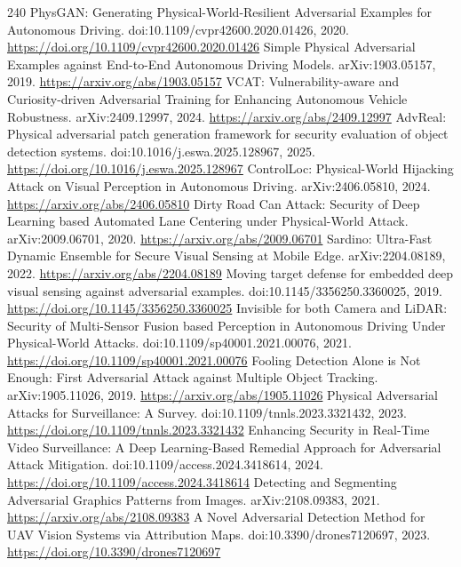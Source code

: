 \documentclass[11pt]{article}
\begin{document}
\begin{thebibliography}{240}
 PhysGAN: Generating Physical-World-Resilient Adversarial Examples for Autonomous Driving. doi:10.1109/cvpr42600.2020.01426, 2020. \url{https://doi.org/10.1109/cvpr42600.2020.01426}
 Simple Physical Adversarial Examples against End-to-End Autonomous Driving Models. arXiv:1903.05157, 2019. \url{https://arxiv.org/abs/1903.05157}
 VCAT: Vulnerability-aware and Curiosity-driven Adversarial Training for Enhancing Autonomous Vehicle Robustness. arXiv:2409.12997, 2024. \url{https://arxiv.org/abs/2409.12997}
 AdvReal: Physical adversarial patch generation framework for security evaluation of object detection systems. doi:10.1016/j.eswa.2025.128967, 2025. \url{https://doi.org/10.1016/j.eswa.2025.128967}
 ControlLoc: Physical-World Hijacking Attack on Visual Perception in Autonomous Driving. arXiv:2406.05810, 2024. \url{https://arxiv.org/abs/2406.05810}
 Dirty Road Can Attack: Security of Deep Learning based Automated Lane Centering under Physical-World Attack. arXiv:2009.06701, 2020. \url{https://arxiv.org/abs/2009.06701}
 Sardino: Ultra-Fast Dynamic Ensemble for Secure Visual Sensing at Mobile Edge. arXiv:2204.08189, 2022. \url{https://arxiv.org/abs/2204.08189}
 Moving target defense for embedded deep visual sensing against adversarial examples. doi:10.1145/3356250.3360025, 2019. \url{https://doi.org/10.1145/3356250.3360025}
 Invisible for both Camera and LiDAR: Security of Multi-Sensor Fusion based Perception in Autonomous Driving Under Physical-World Attacks. doi:10.1109/sp40001.2021.00076, 2021. \url{https://doi.org/10.1109/sp40001.2021.00076}
 Fooling Detection Alone is Not Enough: First Adversarial Attack against Multiple Object Tracking. arXiv:1905.11026, 2019. \url{https://arxiv.org/abs/1905.11026}
 Physical Adversarial Attacks for Surveillance: A Survey. doi:10.1109/tnnls.2023.3321432, 2023. \url{https://doi.org/10.1109/tnnls.2023.3321432}
 Enhancing Security in Real-Time Video Surveillance: A Deep Learning-Based Remedial Approach for Adversarial Attack Mitigation. doi:10.1109/access.2024.3418614, 2024. \url{https://doi.org/10.1109/access.2024.3418614}
 Detecting and Segmenting Adversarial Graphics Patterns from Images. arXiv:2108.09383, 2021. \url{https://arxiv.org/abs/2108.09383}
 A Novel Adversarial Detection Method for UAV Vision Systems via Attribution Maps. doi:10.3390/drones7120697, 2023. \url{https://doi.org/10.3390/drones7120697}

\end{thebibliography}
\end{document}
